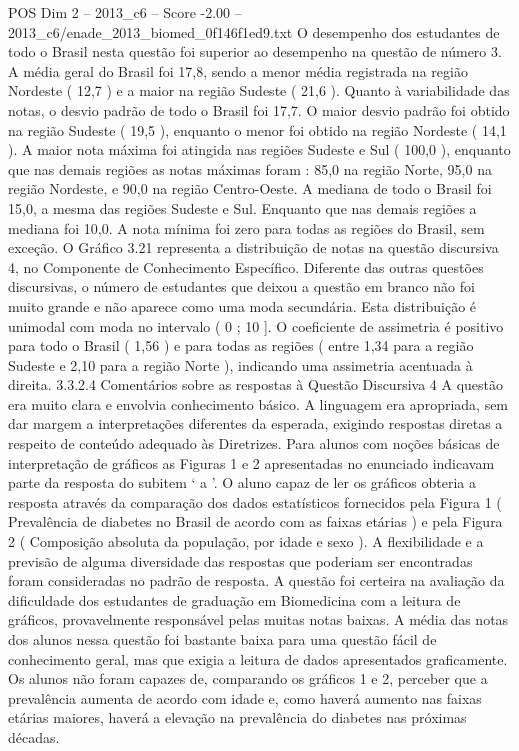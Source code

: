 \begin{textsample}{POS Dim 2 – 2013\_c6 – Score -2.00 – 2013\_c6/enade\_2013\_biomed\_0f146f1ed9.txt}
O desempenho dos estudantes de todo o Brasil nesta questão foi superior ao desempenho na questão de número 3.
A média geral do Brasil foi 17,8, sendo a menor média registrada na região Nordeste ( 12,7 ) e a maior na região Sudeste ( 21,6 ).
Quanto à variabilidade das notas, o desvio padrão de todo o Brasil foi 17,7.
O maior desvio padrão foi obtido na região Sudeste ( 19,5 ), enquanto o menor foi obtido na região Nordeste ( 14,1 ).
A maior nota máxima foi atingida nas regiões Sudeste e Sul ( 100,0 ), enquanto que nas demais regiões as notas máximas foram : 85,0 na região Norte, 95,0 na região Nordeste, e 90,0 na região Centro-Oeste.
A mediana de todo o Brasil foi 15,0, a mesma das regiões Sudeste e Sul.
Enquanto que nas demais regiões a mediana foi 10,0.
A nota mínima foi zero para todas as regiões do Brasil, sem exceção.
O Gráfico 3.21 representa a distribuição de notas na questão discursiva 4, no Componente de Conhecimento Específico.
Diferente das outras questões discursivas, o número de estudantes que deixou a questão em branco não foi muito grande e não aparece como uma moda secundária.
Esta distribuição é unimodal com moda no intervalo ( 0 ; 10 ].
O coeficiente de assimetria é positivo para todo o Brasil ( 1,56 ) e para todas as regiões ( entre 1,34 para a região Sudeste e 2,10 para a região Norte ), indicando uma assimetria acentuada à direita. 3.3.2.4 Comentários sobre as respostas à Questão Discursiva 4 A questão era muito clara e envolvia conhecimento básico.
A linguagem era apropriada, sem dar margem a interpretações diferentes da esperada, exigindo respostas diretas a respeito de conteúdo adequado às Diretrizes.
Para alunos com noções básicas de interpretação de gráficos as Figuras 1 e 2 apresentadas no enunciado indicavam parte da resposta do subitem ‘ a ’.
O aluno capaz de ler os gráficos obteria a resposta através da comparação dos dados estatísticos fornecidos pela Figura 1 ( Prevalência de diabetes no Brasil de acordo com as faixas etárias ) e pela Figura 2 ( Composição absoluta da população, por idade e sexo ).
A flexibilidade e a previsão de alguma diversidade das respostas que poderiam ser encontradas foram consideradas no padrão de resposta.
A questão foi certeira na avaliação da dificuldade dos estudantes de graduação em Biomedicina com a leitura de gráficos, provavelmente responsável pelas muitas notas baixas.
A média das notas dos alunos nessa questão foi bastante baixa para uma questão fácil de conhecimento geral, mas que exigia a leitura de dados apresentados graficamente.
Os alunos não foram capazes de, comparando os gráficos 1 e 2, perceber que a prevalência aumenta de acordo com idade e, como haverá aumento nas faixas etárias maiores, haverá a elevação na prevalência do diabetes nas próximas décadas.

\end{textsample}
